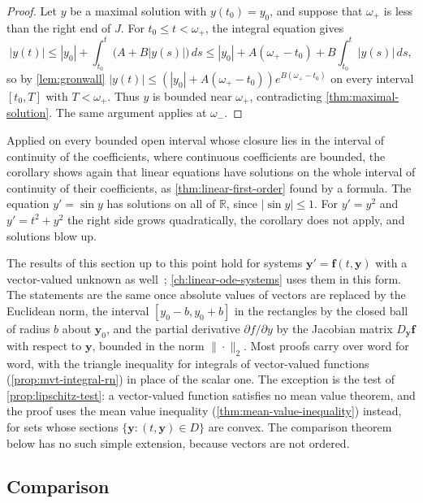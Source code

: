 \begin{proof}
Let $y$ be a maximal solution with $y(t_0)=y_0$, and suppose that $\omega_+$ is less than the right end of $J$. For $t_0\le t<\omega_+$, the integral equation gives
\[
|y(t)|\le|y_0|+\int_{t_0}^t\bigl(A+B|y(s)|\bigr)\,ds\le|y_0|+A(\omega_+-t_0)+B\int_{t_0}^t|y(s)|\,ds ,
\]
so by \cref{lem:gronwall} $|y(t)|\le(|y_0|+A(\omega_+-t_0))e^{B(\omega_+-t_0)}$ on every interval $[t_0,T]$ with $T<\omega_+$. Thus $y$ is bounded near $\omega_+$, contradicting \cref{thm:maximal-solution}. The same argument applies at $\omega_-$.
\end{proof}

Applied on every bounded open interval whose closure lies in the interval of continuity of the coefficients, where continuous coefficients are bounded, the corollary shows again that linear equations have solutions on the whole interval of continuity of their coefficients, as \cref{thm:linear-first-order} found by a formula. The equation $y'=\sin y$ has solutions on all of $\mathbb R$, since $|\sin y|\le1$. For $y'=y^2$ and $y'=t^2+y^2$ the right side grows quadratically, the corollary does not apply, and solutions blow up.

The results of this section up to this point hold for systems $\mathbf y'=\mathbf f(t,\mathbf y)$ with a vector-valued unknown as well~\cite[Chap.~II]{hartman2002}; \cref{ch:linear-ode-systems} uses them in this form. The statements are the same once absolute values of vectors are replaced by the Euclidean norm, the interval $[y_0-b,y_0+b]$ in the rectangles by the closed ball of radius $b$ about $\mathbf y_0$, and the partial derivative $\partial f/\partial y$ by the Jacobian matrix $D_{\mathbf y}\mathbf f$ with respect to $\mathbf y$, bounded in the norm $\|\cdot\|_2$. Most proofs carry over word for word, with the triangle inequality for integrals of vector-valued functions (\cref{prop:mvt-integral-rn}) in place of the scalar one. The exception is the test of \cref{prop:lipschitz-test}: a vector-valued function satisfies no mean value theorem, and the proof uses the mean value inequality (\cref{thm:mean-value-inequality}) instead, for sets whose sections $\{\mathbf y:(t,\mathbf y)\in D\}$ are convex. The comparison theorem below has no such simple extension, because vectors are not ordered.

\subsection{Comparison}

